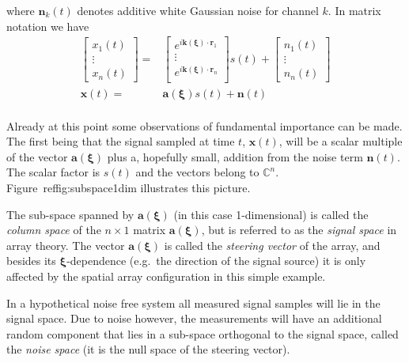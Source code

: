 \documentclass[11pt]{article}
\newcommand{\vct}[1]{\boldsymbol{#1}}
\begin{document}
where $\vct{n}_k(t)$ denotes additive white Gaussian noise for channel $k$.
In matrix notation we have
\begin{equation} \label{eq:1}
\begin{split}
    \begin{bmatrix}
        x_1(t)\\
        \vdots\\
        x_n(t)
    \end{bmatrix}
    =&
    \begin{bmatrix}
        e^{i{\vct{k}(\vct{\xi})}\cdot{\vct{r}_1}}\\
        \vdots\\
        e^{i{\vct{k}(\vct{\xi})}\cdot{\vct{r}_n}} \\
    \end{bmatrix}
    s(t) +
    \begin{bmatrix}
        n_1(t)\\
        \vdots\\
        n_n(t)
    \end{bmatrix}
    \\
    \vct{x}(t) =& \vct{a}(\vct{\xi})s(t) + \vct{n}(t)\\
\end{split}
\end{equation}

Already at this point some observations of fundamental importance can be made.
The first being that the signal sampled at time $t$, $\vct{x}(t)$, will be a scalar multiple of the vector $\vct{a}(\vct{\xi})$ plus a, hopefully small, addition from the noise term $\vct{n}(t)$.
The scalar factor is $s(t)$ and the vectors belong to $\mathbb C^n$.
Figure~ref{fig:subspace1dim} illustrates this picture.

The sub-space spanned by $\vct{a}(\vct{\xi})$ (in this case 1-dimensional) is called the \textit{column space} of the $n\times1$ matrix $\vct{a}(\vct{\xi})$, but is referred to as the \textit{signal space} in array theory.
The vector $\vct{a}(\vct{\xi})$ is called the \textit{steering vector} of the array, and besides its $\vct{\xi}$-dependence (e.g.\ the direction of the signal source) it is only affected by the spatial array configuration in this simple example.

In a hypothetical noise free system all measured signal samples will lie in the signal space.
Due to noise however, the measurements will have an additional random component that lies in a sub-space orthogonal to the signal space, called the \textit{noise space} (it is the null space of the steering vector).
\end{document}
